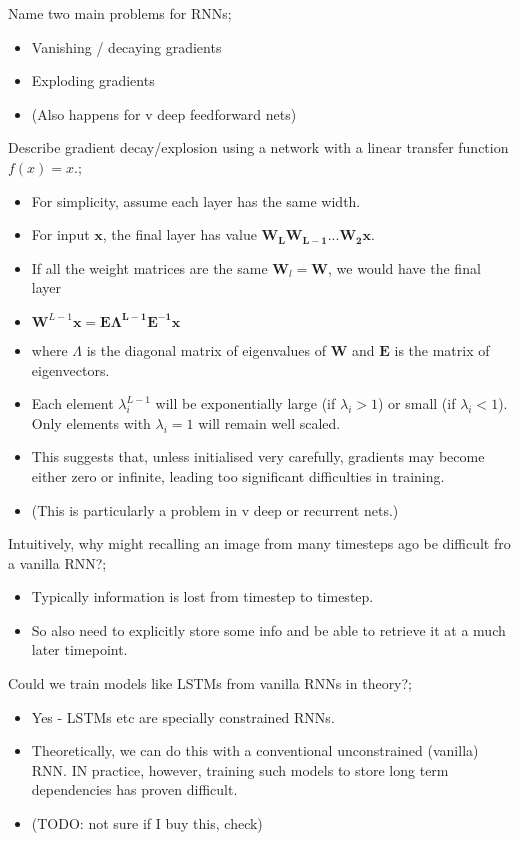 \documentclass{article}
\begin{document}
Name two main problems for RNNs; \begin{itemize}
    \item Vanishing / decaying gradients
    \item Exploding gradients
    \item (Also happens for v deep feedforward nets)
\end{itemize}

Describe gradient decay/explosion using a network with a linear transfer function $f(x) = x$.; \begin{itemize}
    \item For simplicity, assume each layer has the same width.
    \item For input $\bm{x}$, the final layer has value $\bm{W_LW_{L-1}...W_2x}$.
    \item If all the weight matrices are the same $\bm{W}_l = \bm{W}$, we would have the final layer
    \item $\bm{W}^{L-1}\bm{x = E\Lambda^{L-1}E^{-1}x}$
    \item where $\Lambda$ is the diagonal matrix of eigenvalues of $\bm{W}$ and $\bm{E}$ is the matrix of eigenvectors.
    \item Each element $\lambda_i^{L-1}$ will be exponentially large (if $\lambda_i > 1$) or small (if $\lambda_i < 1$). Only elements with $\lambda_i = 1$ will remain well scaled.
    \item This suggests that, unless initialised very carefully, gradients may become either zero or infinite, leading too significant difficulties in training.
    \item (This is particularly a problem in v deep or recurrent nets.)
\end{itemize}

Intuitively, why might recalling an image from many timesteps ago be difficult fro a vanilla RNN?; \begin{itemize}
    \item Typically information is lost from timestep to timestep.
    \item So also need to explicitly store some info and be able to retrieve it at a much later timepoint.
\end{itemize}

Could we train models like LSTMs from vanilla RNNs in theory?; \begin{itemize}
    \item Yes - LSTMs etc are specially constrained RNNs. 
    \item Theoretically, we can do this with a conventional unconstrained (vanilla) RNN. IN practice, however, training such models to store long term dependencies has proven difficult.
    \item (TODO: not sure if I buy this, check)
\end{itemize}
\end{document}
